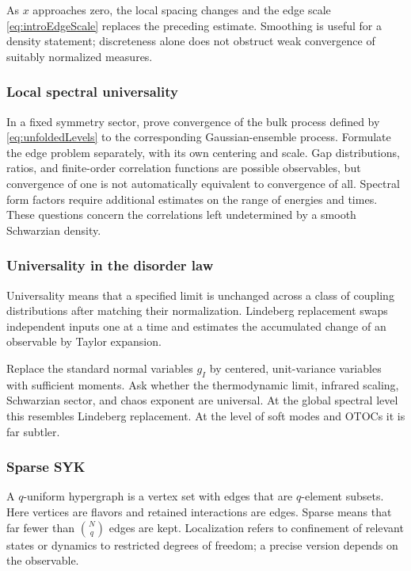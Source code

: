 \documentclass[11pt]{article}
\numberwithin{equation}{section}
\theoremstyle{exposition}
\theoremstyle{result}
\begin{document}
As $x$ approaches zero, the local spacing changes and the edge scale \eqref{eq:introEdgeScale} replaces the preceding estimate. Smoothing is useful for a density statement; discreteness alone does not obstruct weak convergence of suitably normalized measures.

\subsubsection{Local spectral universality}
In a fixed symmetry sector, prove convergence of the bulk process defined by \eqref{eq:unfoldedLevels} to the corresponding Gaussian-ensemble process. Formulate the edge problem separately, with its own centering and scale. Gap distributions, ratios, and finite-order correlation functions are possible observables, but convergence of one is not automatically equivalent to convergence of all. Spectral form factors require additional estimates on the range of energies and times. These questions concern the correlations left undetermined by a smooth Schwarzian density.

\subsubsection{Universality in the disorder law}

Universality means that a specified limit is unchanged across a class of coupling distributions after matching their normalization. Lindeberg replacement swaps independent inputs one at a time and estimates the accumulated change of an observable by Taylor expansion.

Replace the standard normal variables $g_I$ by centered, unit-variance variables with sufficient moments. Ask whether the thermodynamic limit, infrared scaling, Schwarzian sector, and chaos exponent are universal. At the global spectral level this resembles Lindeberg replacement. At the level of soft modes and OTOCs it is far subtler.

\subsubsection{Sparse SYK}

A $q$-uniform hypergraph is a vertex set with edges that are $q$-element subsets. Here vertices are flavors and retained interactions are edges. Sparse means that far fewer than $\binom Nq$ edges are kept. Localization refers to confinement of relevant states or dynamics to restricted degrees of freedom; a precise version depends on the observable.
\end{document}
